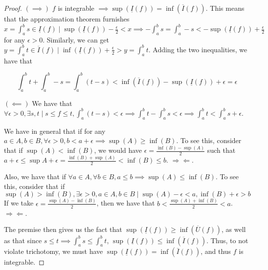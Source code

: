 \documentclass[12pt,letterpaper]{article}
\theoremstyle{definition}
\newcommand{\contra}{\Rightarrow\!\Leftarrow}
\begin{document}
\begin{proof}
  $(\implies)$ $f$ is integrable $\implies \sup(\underline{I}(f)) =
  \inf(\overline{I}(f))$. This means that the approximation theorem furnishes $x =
  \int_a^b s \in \underline{I}(f) \mid \sup(\underline{I}(f)) -
  \frac{\epsilon}{2} < x \implies -\int_a^bs = \int_a^b-s < -\sup(\underline{I}(f)) +
  \frac{\epsilon}{2}$ for any $\epsilon > 0$. Similarly, we can get $y = \int_a^b t \in
  \overline{I}(f) \mid \inf(\underline{I}(f)) + \frac{\epsilon}{2} > y =
  \int_a^b t$. Adding the two inequalities, we have that

  \[
    \int_a^b t + \int_a^b-s = \int_a^b (t - s) < \inf(\overline{I}(f)) -
    \sup(\underline{I}(f)) + \epsilon = \epsilon
  \]

  $(\impliedby)$
  We have that $\forall \epsilon > 0, \exists s,t \mid s \leq f \leq t,
  \int_a^b(t-s) < \epsilon \implies \int_a^b t - \int_a^bs < \epsilon \implies
  \int_a^bt < \int_a^bs + \epsilon$.

  We have in general that if for any $a \in A, b \in B, \forall \epsilon > 0, b < a +
  \epsilon \implies \sup(A) \geq \inf(B)$. To see this, consider that if
  $\sup(A) < \inf(B)$, we would have $\epsilon = \frac{\inf(B) - \sup(A)}{2}$
  such that $a + \epsilon \leq \sup{A} + \epsilon = \frac{\inf(B) + \sup(A)}{2}
  < \inf(B) \leq b$. $\contra$.

  Also, we have that if $\forall a \in A, \forall b \in B, a \leq b \implies
  \sup(A) \leq \inf(B)$. To see this, consider that if $\sup(A) > \inf(B),
  \exists \epsilon > 0, a \in A, b \in B \mid \sup(A) - \epsilon < a, \inf(B) +
  \epsilon > b$ If we take $\epsilon = \frac{\sup(A) - \inf(B)}{2}$, then we
  have that $b < \frac{\sup(A) + \inf(B)}{2} < a$. $\contra$.

  The premise then gives us the fact that $\sup(\underline{I}(f)) \geq
  \inf(\overline{U}(f))$, as well as that since $s \leq t \implies \int_a^b s
  \leq \int_a^bt$, $\sup(\underline{I}(f)) \leq \inf(\overline{I}(f))$. Thus, to
  not violate trichotomy, we must have $\sup(\underline{I}(f)) =
  \inf(\overline{I}(f))$, and thus $f$ is integrable.
\end{proof}
\end{document}
